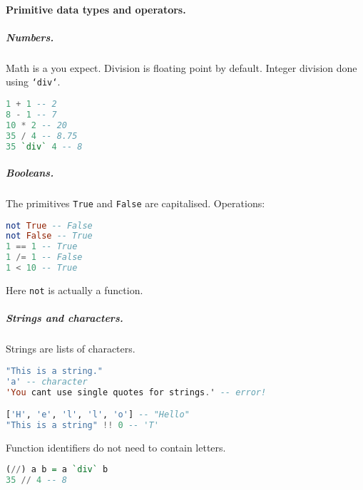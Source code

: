 \paragraph{Primitive data types and operators.}
\subparagraph{Numbers.}
Math is a you expect. Division is floating point by default. Integer division done using \texttt{`div`}.
\begin{lstlisting}[language=haskell, style=snippet]
1 + 1 -- 2
8 - 1 -- 7
10 * 2 -- 20
35 / 4 -- 8.75
35 `div` 4 -- 8
\end{lstlisting}
\subparagraph{Booleans.} The primitives \texttt{True} and \texttt{False} are capitalised. Operations:
\begin{lstlisting}[language=haskell, style=snippet]
not True -- False
not False -- True
1 == 1 -- True
1 /= 1 -- False
1 < 10 -- True
\end{lstlisting}
Here \texttt{not} is actually a function.
\subparagraph{Strings and characters.} Strings are lists of characters.
\begin{lstlisting}[language=haskell, style=snippet]
"This is a string."
'a' -- character
'You cant use single quotes for strings.' -- error!

['H', 'e', 'l', 'l', 'o'] -- "Hello"
"This is a string" !! 0 -- 'T'
\end{lstlisting}

Function identifiers do not need to contain letters.
\begin{lstlisting}[language=haskell, style=snippet]
(//) a b = a `div` b
35 // 4 -- 8
\end{lstlisting}
